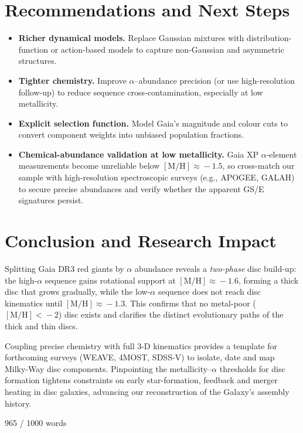 \documentclass[a4paper,10pt]{article}
\begin{document}
\begin{multicols}{2}
\section*{Recommendations and Next Steps}

\begin{itemize}
\item \textbf{Richer dynamical models.} Replace Gaussian mixtures with distribution-function or 
action-based models to capture non-Gaussian and asymmetric structures.  
\item \textbf{Tighter chemistry.} Improve $\alpha$–abundance precision (or use high-resolution 
follow-up) to reduce sequence cross-contamination, especially at low metallicity.  
\item \textbf{Explicit selection function.} Model Gaia’s magnitude and colour cuts to convert 
component weights into unbiased population fractions.  
\item \textbf{Chemical-abundance validation at low metallicity.} Gaia XP $\alpha$-element 
measurements become unreliable below $\mathrm{[M/H]}\!\approx\!-1.5$, so cross-match our 
sample with high-resolution spectroscopic surveys (e.g., APOGEE, GALAH) to secure precise 
abundances and verify whether the apparent GS/E signatures persist.
\end{itemize}

\section*{Conclusion and Research Impact}

Splitting Gaia DR3 red giants by $\alpha$ abundance reveals a \emph{two-phase} disc build-up:  
the high-$\alpha$ sequence gains rotational support at $\mathrm{[M/H]}\!\approx\!-1.6$, forming 
a thick disc that grows gradually, while the low-$\alpha$ sequence does not reach disc 
kinematics until $\mathrm{[M/H]}\!\approx\!-1.3$. This confirms that no metal-poor 
($\mathrm{[M/H]}\!<\!-2$) disc exists and clarifies the distinct evolutionary paths of 
the thick and thin discs.  

Coupling precise chemistry with full 3-D kinematics provides a template for forthcoming surveys 
(WEAVE, 4MOST, SDSS-V) to isolate, date and map Milky-Way disc components. Pinpointing the 
metallicity–$\alpha$ thresholds for disc formation tightens constraints on early star-formation, 
feedback and merger heating in disc galaxies, advancing our reconstruction of the Galaxy’s 
assembly history.  


\newpage{}

965 / 1000 words








  


\end{multicols}
\end{document}
